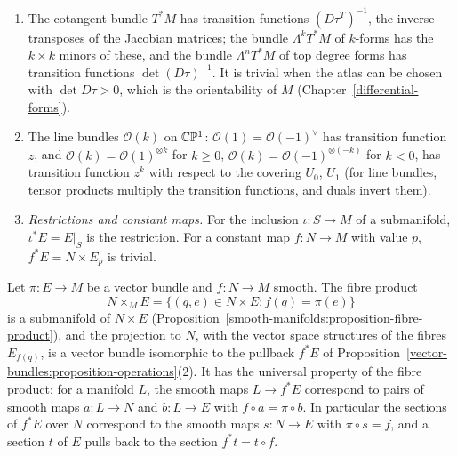 \begin{example}\label{vector-bundles:example-operations}
\begin{enumerate}
\item The cotangent bundle $T^*M$ has transition functions $(D\tau^T)^{-1}$, the inverse transposes of the Jacobian matrices; the bundle $\Lambda^kT^*M$ of $k$-forms has the $k \times k$
minors of these, and the bundle $\Lambda^nT^*M$ of top degree forms has transition functions $\det(D\tau)^{-1}$. It is trivial when the atlas can be chosen with $\det D\tau > 0$,
which is the orientability of $M$ (Chapter~\ref{differential-forms}).
\item The line bundles $\mathcal{O}(k)$ on $\mathbb{C}\mathbb{P}^1$: $\mathcal{O}(1) = \mathcal{O}(-1)^\vee$ has transition function $z$, and $\mathcal{O}(k) = \mathcal{O}(1)^{\otimes k}$ for $k \geq 0$,
$\mathcal{O}(k) = \mathcal{O}(-1)^{\otimes(-k)}$ for $k < 0$, has transition function $z^k$ with respect to the covering $U_0$, $U_1$ (for line bundles, tensor products multiply the
transition functions, and duals invert them).
\item \emph{Restrictions and constant maps.} For the inclusion $\iota \colon S \to M$ of a submanifold, $\iota^*E = E|_S$ is the restriction. For a constant map $f \colon N \to M$ with value $p$,
$f^*E = N \times E_p$ is trivial.
\end{enumerate}
\end{example}

\begin{proposition}\label{vector-bundles:proposition-pullback-fibre-product}
Let $\pi \colon E \to M$ be a vector bundle and $f \colon N \to M$ smooth. The fibre product
\[
N \times_ME = \{(q, e) \in N \times E : f(q) = \pi(e)\}
\]
is a submanifold of $N \times E$ (Proposition~\ref{smooth-manifolds:proposition-fibre-product}), and the projection to $N$, with the vector space structures of the
fibres $E_{f(q)}$, is a vector bundle isomorphic to the pullback $f^*E$ of Proposition~\ref{vector-bundles:proposition-operations}(2). It has the universal
property of the fibre product: for a manifold $L$, the smooth maps $L \to f^*E$ correspond to pairs of smooth maps $a \colon L \to N$ and $b \colon L \to E$ with
$f \circ a = \pi \circ b$. In particular the sections of $f^*E$ over $N$ correspond to the smooth maps $s \colon N \to E$ with $\pi \circ s = f$, and a section $t$ of
$E$ pulls back to the section $f^*t = t \circ f$.
\end{proposition}


